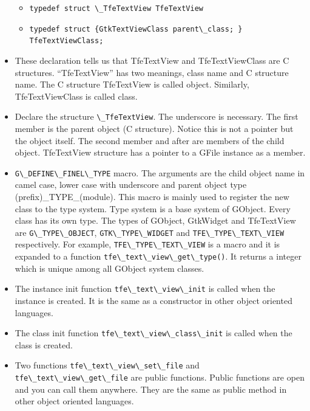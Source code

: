 \begin{itemize}
  \begin{itemize}
  \tightlist
  \item
    \passthrough{\lstinline!typedef struct \_TfeTextView TfeTextView!}
  \item
    \passthrough{\lstinline!typedef struct \{GtkTextViewClass parent\_class; \} TfeTextViewClass;!}
  \end{itemize}
\item
  These declaration tells us that TfeTextView and TfeTextViewClass are C
  structures. ``TfeTextView'' has two meanings, class name and C
  structure name. The C structure TfeTextView is called object.
  Similarly, TfeTextViewClass is called class.
\item
  Declare the structure \passthrough{\lstinline!\_TfeTextView!}. The
  underscore is necessary. The first member is the parent object (C
  structure). Notice this is not a pointer but the object itself. The
  second member and after are members of the child object. TfeTextView
  structure has a pointer to a GFile instance as a member.
\item
  \passthrough{\lstinline!G\_DEFINE\_FINEL\_TYPE!} macro. The arguments
  are the child object name in camel case, lower case with underscore
  and parent object type (prefix)\_TYPE\_(module). This macro is mainly
  used to register the new class to the type system. Type system is a
  base system of GObject. Every class has its own type. The types of
  GObject, GtkWidget and TfeTextView are
  \passthrough{\lstinline!G\_TYPE\_OBJECT!},
  \passthrough{\lstinline!GTK\_TYPE\_WIDGET!} and
  \passthrough{\lstinline!TFE\_TYPE\_TEXT\_VIEW!} respectively. For
  example, \passthrough{\lstinline!TFE\_TYPE\_TEXT\_VIEW!} is a macro
  and it is expanded to a function
  \passthrough{\lstinline!tfe\_text\_view\_get\_type()!}. It returns a
  integer which is unique among all GObject system classes.
\item
  The instance init function
  \passthrough{\lstinline!tfe\_text\_view\_init!} is called when the
  instance is created. It is the same as a constructor in other object
  oriented languages.
\item
  The class init function
  \passthrough{\lstinline!tfe\_text\_view\_class\_init!} is called when
  the class is created.
\item
  Two functions \passthrough{\lstinline!tfe\_text\_view\_set\_file!} and
  \passthrough{\lstinline!tfe\_text\_view\_get\_file!} are public
  functions. Public functions are open and you can call them anywhere.
  They are the same as public method in other object oriented languages.

\end{itemize}

